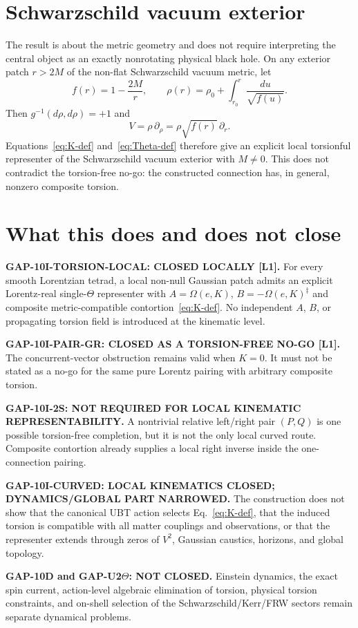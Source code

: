 \documentclass[12pt,a4paper]{article}
\theoremstyle{remark}\newtheorem{remark}[definition]{Remark}
\begin{document}
\section{Schwarzschild vacuum exterior}
The result is about the metric geometry and does not require interpreting the
central object as an exactly nonrotating physical black hole.  On any exterior
patch $r>2M$ of the non-flat Schwarzschild vacuum metric, let
\begin{equation}
 f(r)=1-\frac{2M}{r},
 \qquad
 \rho(r)=\rho_0+\int_{r_0}^{r}\frac{du}{\sqrt{f(u)}}.
 \label{eq:schwarzschild-rho}
\end{equation}
Then $g^{-1}(d\rho,d\rho)=+1$ and
\begin{equation}
 V=\rho\,\partial_\rho
   =\rho\sqrt{f(r)}\,\partial_r.
\end{equation}
Equations~\eqref{eq:K-def} and~\eqref{eq:Theta-def} therefore give an explicit
local torsionful representer of the Schwarzschild vacuum exterior with
$M\ne0$.  This does not contradict the torsion-free no-go: the constructed
connection has, in general, nonzero composite torsion.

\section{What this does and does not close}
\begin{tcolorbox}[colback=green!6!white,colframe=green!55!black,
 title=Exact status after the torsionful construction]
\textbf{GAP-10I-TORSION-LOCAL: CLOSED LOCALLY [L1].}
For every smooth Lorentzian tetrad, a local non-null Gaussian patch admits an
explicit Lorentz-real single-$\Theta$ representer with
$A=\Omega(e,K)$, $B=-\Omega(e,K)^\ddagger$ and composite
metric-compatible contortion~\eqref{eq:K-def}.  No independent $A$, $B$, or
propagating torsion field is introduced at the kinematic level.

\medskip
\textbf{GAP-10I-PAIR-GR: CLOSED AS A TORSION-FREE NO-GO [L1].}
The concurrent-vector obstruction remains valid when $K=0$.  It must not be
stated as a no-go for the same pure Lorentz pairing with arbitrary composite
torsion.

\medskip
\textbf{GAP-10I-2S: NOT REQUIRED FOR LOCAL KINEMATIC REPRESENTABILITY.}
A nontrivial relative left/right pair $(P,Q)$ is one possible torsion-free
completion, but it is not the only local curved route.  Composite contortion
already supplies a local right inverse inside the one-connection pairing.

\medskip
\textbf{GAP-10I-CURVED: LOCAL KINEMATICS CLOSED; DYNAMICS/GLOBAL PART NARROWED.}
The construction does not show that the canonical UBT action selects
Eq.~\eqref{eq:K-def}, that the induced torsion is compatible with all matter
couplings and observations, or that the representer extends through zeros of
$V^2$, Gaussian caustics, horizons, and global topology.

\medskip
\textbf{GAP-10D and GAP-U2$\Theta$: NOT CLOSED.}
Einstein dynamics, the exact spin current, action-level algebraic elimination
of torsion, physical torsion constraints, and on-shell selection of the
Schwarzschild/Kerr/FRW sectors remain separate dynamical problems.
\end{tcolorbox}
\end{document}

